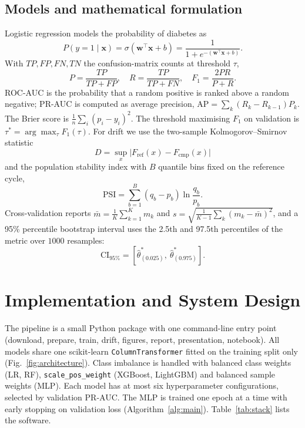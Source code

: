 \documentclass[conference]{IEEEtran}
\begin{document}
\subsection{Models and mathematical formulation}
Logistic regression models the probability of diabetes as
\begin{equation}
P(y=1\mid\mathbf{x}) = \sigma(\mathbf{w}^\top\mathbf{x}+b) = \frac{1}{1+e^{-(\mathbf{w}^\top\mathbf{x}+b)}}.
\end{equation}
With $TP, FP, FN, TN$ the confusion-matrix counts at threshold $\tau$,
\begin{equation}
P=\frac{TP}{TP+FP},\quad R=\frac{TP}{TP+FN},\quad F_1=\frac{2PR}{P+R}.
\end{equation}
ROC-AUC is the probability that a random positive is ranked above a random negative; PR-AUC is
computed as average precision, $\mathrm{AP}=\sum_k (R_k-R_{k-1})P_k$. The Brier score is
$\frac{1}{n}\sum_i (p_i-y_i)^2$. The threshold maximising $F_1$ on validation is
$\tau^\ast=\arg\max_\tau F_1(\tau)$. For drift we use the two-sample Kolmogorov--Smirnov statistic
\begin{equation}
D=\sup_x \lvert F_{\text{ref}}(x)-F_{\text{cmp}}(x)\rvert
\end{equation}
and the population stability index with $B$ quantile bins fixed on the reference cycle,
\begin{equation}
\mathrm{PSI}=\sum_{b=1}^{B}(q_b-p_b)\ln\frac{q_b}{p_b}.
\end{equation}
Cross-validation reports $\bar{m}=\frac{1}{K}\sum_{k=1}^K m_k$ and
$s=\sqrt{\frac{1}{K-1}\sum_k (m_k-\bar m)^2}$, and a 95\% percentile bootstrap interval uses
the 2.5th and 97.5th percentiles of the metric over $1000$ resamples:
\begin{equation}
\mathrm{CI}_{95\%}=\left[\hat\theta^\ast_{(0.025)},\ \hat\theta^\ast_{(0.975)}\right].
\end{equation}

\section{Implementation and System Design}
The pipeline is a small Python package with one command-line entry point (download, prepare, train,
drift, figures, report, presentation, notebook). All models share one scikit-learn
\texttt{ColumnTransformer} fitted on the training split only (Fig.~\ref{fig:architecture}).
Class imbalance is handled with balanced class weights (LR, RF), \texttt{scale\_pos\_weight}
(XGBoost, LightGBM) and balanced sample weights (MLP). Each model has at most six hyperparameter
configurations, selected by validation PR-AUC. The MLP is trained one epoch at a time with early
stopping on validation loss (Algorithm~\ref{alg:main}). Table~\ref{tab:stack} lists the software.
\end{document}
